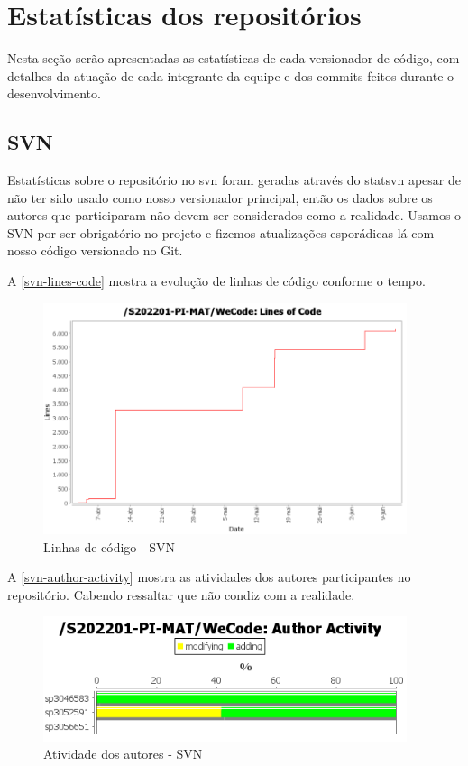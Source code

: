 \section{Estatísticas dos repositórios}
Nesta seção serão apresentadas as estatísticas de cada versionador de código, com detalhes da atuação de cada integrante da equipe e dos commits feitos durante o desenvolvimento.

\subsection{SVN}
Estatísticas sobre o repositório no \gls{svn} foram geradas através do \gls{statsvn} apesar de não ter sido usado como nosso versionador principal, então os dados sobre os autores que participaram não devem ser considerados como a realidade. Usamos o SVN por ser obrigatório no projeto e fizemos atualizações esporádicas lá com nosso código versionado no Git.

A \autoref{svn-lines-code} mostra a evolução de linhas de código conforme o tempo.
\begin{figure}[H]
	\centering
	\caption{\label{svn-lines-code}Linhas de código - SVN}
	\includegraphics[width=0.95\textwidth]{../imagens/stats/svn-lines-code.png}
\end{figure}

A \autoref{svn-author-activity} mostra as atividades dos autores participantes no repositório. Cabendo ressaltar que não condiz com a realidade.
\begin{figure}[H]
	\centering
	\caption{\label{svn-author-activity}Atividade dos autores - SVN}
	\includegraphics[width=0.95\textwidth]{../imagens/stats/svn-author-activity.png}
\end{figure}

